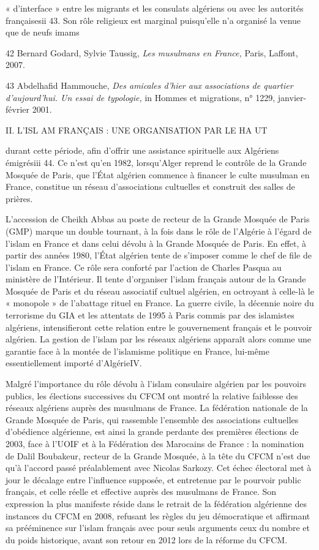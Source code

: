 « d'interface » entre les migrants et les consulats algériens ou avec
les autorités françaisesii 43. Son rôle religieux est marginal
puisqu'elle n'a organisé la venue que de neufs imams

42 Bernard Godard, Sylvie Taussig, \emph{Les musulmans en France,}
Paris, Laffont, 2007.

43 Abdelhafid Hammouche, \emph{Des amicales d'hier aux associations de
quartier d'aujourd'hui. Un essai de typologie,} in Hommes et migrations,
n° 1229, janvier-février 2001.

II. L'ISL AM FRANÇAIS : UNE ORGANISATION PAR LE HA UT

durant cette période, afin d'offrir une assistance spirituelle aux
Algériens émigrésiii 44. Ce n'est qu'en 1982, lorsqu'Alger reprend le
contrôle de la Grande Mosquée de Paris, que l'État algérien commence à
financer le culte musulman en France, constitue un réseau d'associations
cultuelles et construit des salles de prières.

L'accession de Cheikh Abbas au poste de recteur de la Grande Mosquée de
Paris (GMP) marque un double tournant, à la fois dans le rôle de
l'Algérie à l'égard de l'islam en France et dans celui dévolu à la
Grande Mosquée de Paris. En effet, à partir des années 1980, l'État
algérien tente de s'imposer comme le chef de file de l'islam en France.
Ce rôle sera conforté par l'action de Charles Pasqua au ministère de
l'Intérieur. Il tente d'organiser l'islam français autour de la Grande
Mosquée de Paris et du réseau associatif cultuel algérien, en octroyant
à celle-là le « monopole » de l'abattage rituel en France. La guerre
civile, la décennie noire du terrorisme du GIA et les attentats de 1995
à Paris commis par des islamistes algériens, intensifieront cette
relation entre le gouvernement français et le pouvoir algérien. La
gestion de l'islam par les réseaux algériens apparaît alors comme une
garantie face à la montée de l'islamisme politique en France, lui-même
essentiellement importé d'AlgérieIV.

Malgré l'importance du rôle dévolu à l'islam consulaire algérien par les
pouvoirs publics, les élections successives du CFCM ont montré la
relative faiblesse des réseaux algériens auprès des musulmans de France.
La fédération nationale de la Grande Mosquée de Paris, qui rassemble
l'ensemble des associations cultuelles d'obédience algérienne, est ainsi
la grande perdante des premières élections de 2003, face à l'UOIF et à
la Fédération des Marocains de France : la nomination de Dalil
Boubakeur, recteur de la Grande Mosquée, à la tête du CFCM n'est due
qu'à l'accord passé préalablement avec Nicolas Sarkozy. Cet échec
électoral met à jour le décalage entre l'influence supposée, et
entretenue par le pourvoir public français, et celle réelle et effective
auprès des musulmans de France. Son expression la plus manifeste réside
dans le retrait de la fédération algérienne des instances du CFCM en
2008, refusant les règles du jeu démocratique et affirmant sa
prééminence sur l'islam français avec pour seuls arguments ceux du
nombre et du poids historique, avant son retour en 2012 lors de la
réforme du CFCM.

